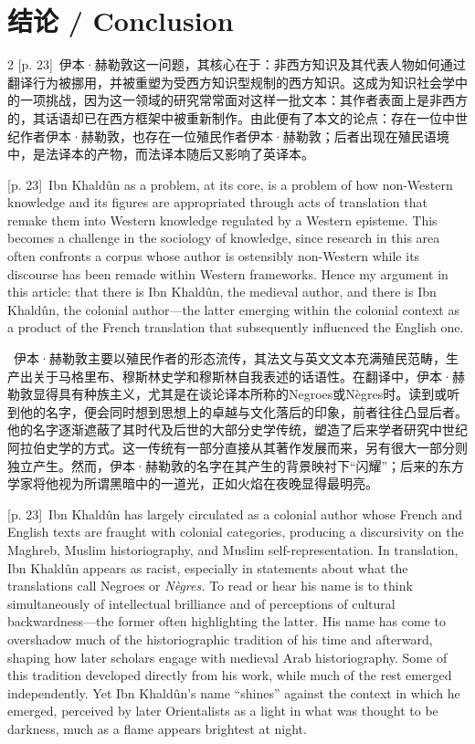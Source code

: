 \documentclass[10pt,a4paper]{article}
\begin{document}
\section*{结论 / Conclusion}
\begin{paracol}{2}
{\scriptsize\color{gray} [p. 23]}\ 伊本·赫勒敦这一问题，其核心在于：非西方知识及其代表人物如何通过翻译行为被挪用，并被重塑为受西方知识型规制的西方知识。这成为知识社会学中的一项挑战，因为这一领域的研究常常面对这样一批文本：其作者表面上是非西方的，其话语却已在西方框架中被重新制作。由此便有了本文的论点：存在一位中世纪作者伊本·赫勒敦，也存在一位殖民作者伊本·赫勒敦；后者出现在殖民语境中，是法译本的产物，而法译本随后又影响了英译本。\par
\switchcolumn
{\scriptsize\color{gray} [p. 23]}\ Ibn Khaldûn as a problem, at its core, is a problem of how non-Western knowledge and its figures are appropriated through acts of translation that remake them into Western knowledge regulated by a Western episteme. This becomes a challenge in the sociology of knowledge, since research in this area often confronts a corpus whose author is ostensibly non-Western while its discourse has been remade within Western frameworks. Hence my argument in this article: that there is Ibn Khaldûn, the medieval author, and there is Ibn Khaldûn, the colonial author—the latter emerging within the colonial context as a product of the French translation that subsequently influenced the English one.\par
\switchcolumn*
{\scriptsize\color{gray} [p. 23]}\ 伊本·赫勒敦主要以殖民作者的形态流传，其法文与英文文本充满殖民范畴，生产出关于马格里布、穆斯林史学和穆斯林自我表述的话语性。在翻译中，伊本·赫勒敦显得具有种族主义，尤其是在谈论译本所称的Negroes或Nègres时。读到或听到他的名字，便会同时想到思想上的卓越与文化落后的印象，前者往往凸显后者。他的名字逐渐遮蔽了其时代及后世的大部分史学传统，塑造了后来学者研究中世纪阿拉伯史学的方式。这一传统有一部分直接从其著作发展而来，另有很大一部分则独立产生。然而，伊本·赫勒敦的名字在其产生的背景映衬下“闪耀”；后来的东方学家将他视为所谓黑暗中的一道光，正如火焰在夜晚显得最明亮。\par
\switchcolumn
{\scriptsize\color{gray} [p. 23]}\ Ibn Khaldûn has largely circulated as a colonial author whose French and English texts are fraught with colonial categories, producing a discursivity on the Maghreb, Muslim historiography, and Muslim self-representation. In translation, Ibn Khaldûn appears as racist, especially in statements about what the translations call Negroes or \textit{Nègres.} To read or hear his name is to think simultaneously of intellectual brilliance and of perceptions of cultural backwardness—the former often highlighting the latter. His name has come to overshadow much of the historiographic tradition of his time and afterward, shaping how later scholars engage with medieval Arab historiography. Some of this tradition developed directly from his work, while much of the rest emerged independently. Yet Ibn Khaldûn’s name “shines” against the context in which he emerged, perceived by later Orientalists as a light in what was thought to be darkness, much as a flame appears brightest at night.\par

\end{paracol}
\end{document}

